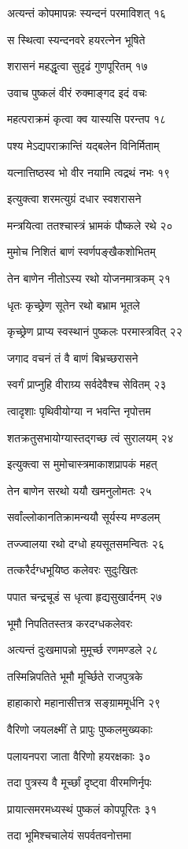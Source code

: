 अत्यन्तं कोपमापन्नः स्यन्दनं परमाविशत् १६

स स्थित्वा स्यन्दनवरे हयरत्नेन भूषिते

शरासनं महद्धृत्वा सुदृढं गुणपूरितम् १७

उवाच पुष्कलं वीरं रुक्माङ्गद इदं वचः

महत्पराक्रमं कृत्वा क्व यास्यसि परन्तप १८

पश्य मेऽद्यपराक्रान्तिं यद्बलेन विनिर्मिताम्

यत्नात्तिष्ठस्व भो वीर नयामि त्वद्रथं नभः १९

इत्युक्त्वा शरमत्युग्रं दधार स्वशरासने

मन्त्रयित्वा ततश्चास्त्रं भ्रामकं पौष्कले रथे २०

मुमोच निशितं बाणं स्वर्णपङ्खैकशोभितम्

तेन बाणेन नीतोऽस्य रथो योजनमात्रकम् २१

धृतः कृच्छ्रेण सूतेन रथो बभ्राम भूतले

कृच्छ्रेण प्राप्य स्वस्थानं पुष्कलः परमास्त्रवित् २२

जगाद वचनं तं वै बाणं बिभ्रच्छरासने

स्वर्गं प्राप्नुहि वीराग्र्य सर्वदेवैश्च सेवितम् २३

त्वादृशाः पृथिवीयोग्या न भवन्ति नृपोत्तम

शतक्रतुसभायोग्यास्तद्गच्छ त्वं सुरालयम् २४

इत्युक्त्वा स मुमोचास्त्रमाकाशप्रापकं महत्

तेन बाणेन सरथो ययौ खमनुलोमतः २५

सर्वांल्लोकानतिक्रामन्ययौ सूर्यस्य मण्डलम्

तज्ज्वालया रथो दग्धो हयसूतसमन्वितः २६

तत्करैर्दग्धभूयिष्ठ कलेवरः सुदुःखितः

पपात चन्द्रचूडं स धृत्वा हृद्यसुखार्दनम् २७

भूमौ निपतितस्तत्र करदग्धकलेवरः

अत्यन्तं दुःखमापन्नो मुमूर्च्छ रणमण्डले २८

तस्मिन्निपतिते भूमौ मूर्च्छिते राजपुत्रके

हाहाकारो महानासीत्तत्र सङ्ग्राममूर्धनि २९

वैरिणो जयलक्ष्मीं ते प्रापुः पुष्कलमुख्यकाः

पलायनपरा जाता वैरिणो हयरक्षकाः ३०

तदा पुत्रस्य वै मूर्च्छां दृष्ट्वा वीरमणिर्नृपः

प्रायात्समरमध्यस्थं पुष्कलं कोपपूरितः ३१

तदा भूमिश्चचालेयं सपर्वतवनोत्तमा

